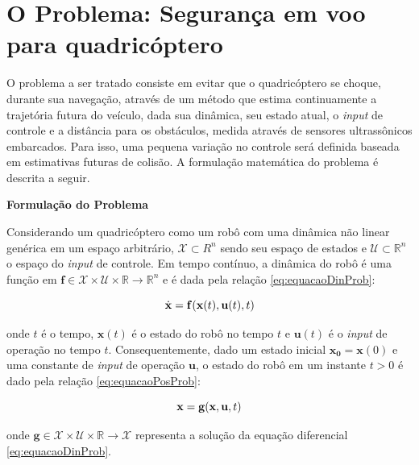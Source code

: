 \documentclass[a4paper, 12pt]{article}
\begin{document}
\newpage

\section{O Problema: Segurança em voo para quadricóptero}
\label{sec:prob}

O problema a ser tratado consiste em evitar que o quadricóptero se choque, durante sua navegação, através de um método que estima continuamente a trajetória futura do veículo, dada sua dinâmica, seu estado atual, o \textit{input} de controle e a distância para os obstáculos, medida através de sensores ultrassônicos embarcados. Para isso, uma pequena variação no controle será definida baseada em estimativas futuras de colisão. A formulação matemática do problema é descrita a seguir.



\noindent\textbf{Formulação do Problema}

Considerando um quadricóptero como um robô com uma dinâmica não linear genérica em um espaço arbitrário, $\mathcal{X} \subset R^{n}$ sendo seu espaço de estados e $\mathcal{U} \subset \mathbb{R}^{n}$ o espaço do \textit{input} de controle. Em tempo contínuo, a dinâmica do robô é uma função em $\mathbf{f} \in \mathcal{X} \times \mathcal{U} \times \mathbb{R} \rightarrow \mathbb{R}^{n}$ e é dada pela relação \ref{eq:equacaoDinProb}:

\begin{equation}
\centering
\dot{\mathbf{x}} = \mathbf{f}(\mathbf{x}(t),\mathbf{u}(t),t)  
\label{eq:equacaoDinProb}
\end{equation}

\noindent onde $t$ é o tempo, $\mathbf{x}(t)$ é o estado do robô no tempo $t$ e $\mathbf{u}(t)$ é o \textit{input} de operação no tempo $t$. Consequentemente, dado um estado inicial $\mathbf{x_0} = \mathbf{x}(0)$ e uma constante de \textit{input} de operação $\mathbf{u}$, o estado do robô em um instante $t > 0$ é dado pela relação \ref{eq:equacaoPosProb}:
 

\begin{equation}
\centering
\mathbf{x} = \mathbf{g}(\mathbf{x},\mathbf{u},t)  
\label{eq:equacaoPosProb}
\end{equation}

\noindent onde $\mathbf{g} \in \mathcal{X} \times \mathcal{U} \times \mathbb{R} \rightarrow \mathcal{X}$ representa a solução da equação diferencial \ref{eq:equacaoDinProb}.
\end{document}

